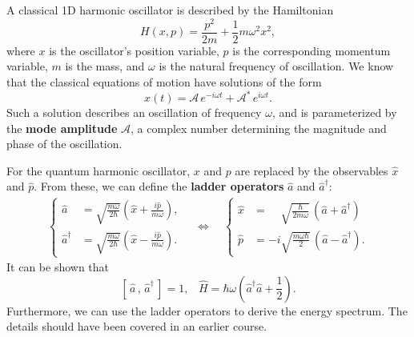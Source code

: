 \documentclass[prx,12pt]{revtex4-2}
\begin{document}
A classical 1D harmonic oscillator is described by the Hamiltonian
\begin{equation}
  H(x,p) = \frac{p^2}{2m} + \frac{1}{2}m\omega^2x^2,
  \label{Hclass}
\end{equation}
where $x$ is the oscillator's position variable, $p$ is the
corresponding momentum variable, $m$ is the mass, and $\omega$ is the
natural frequency of oscillation.  We know that the classical
equations of motion have solutions of the form
\begin{equation}
  x(t) = \mathcal{A}\, e^{-i\omega t} + \mathcal{A}^*\, e^{i\omega t}.
  \label{xt0}
\end{equation}
Such a solution describes an oscillation of frequency $\omega$, and is
parameterized by the \textbf{mode amplitude} $\mathcal{A}$, a complex
number determining the magnitude and phase of the oscillation.

For the quantum harmonic oscillator, $x$ and $p$ are replaced by the
observables $\hat{x}$ and $\hat{p}$.  From these, we can define the
\textbf{ladder operators} $\hat{a}$ and $\hat{a}^\dagger$:
\begin{align}
  \left\{
  \begin{aligned}
  \hat{a} &= \sqrt{\frac{m\omega}{2\hbar}} \left(\hat{x} + \frac{i\hat{p}}{m\omega}\right), \\
  \hat{a}^\dagger &= \sqrt{\frac{m\omega}{2\hbar}} \left(\hat{x} - \frac{i\hat{p}}{m\omega}\right).
  \end{aligned}\right. \quad
  \Leftrightarrow\quad\left\{
  \begin{aligned}
    \hat{x} &= \;\;\;\;\sqrt{\frac{\hbar}{2m\omega}}
    \, \left(\hat{a}+\hat{a}^\dagger\right) \\
    \hat{p} &= -i \sqrt{\frac{m\omega\hbar}{2}}
    \, \left(\hat{a}-\hat{a}^\dagger\right).
  \end{aligned}\right.
  \label{create_annihilate}
\end{align}
It can be shown that
\begin{equation}
  \left[\,\hat{a}\,,\,\hat{a}^\dagger\,\right] = 1, \;\;\;
  \hat{H} = \hbar\omega\left(\hat{a}^\dagger\hat{a}+\frac{1}{2}\right).
  \label{create_annihilate_qho}
\end{equation}
Furthermore, we can use the ladder operators to derive the energy
spectrum.  The details should have been covered in an earlier course.
\end{document}
